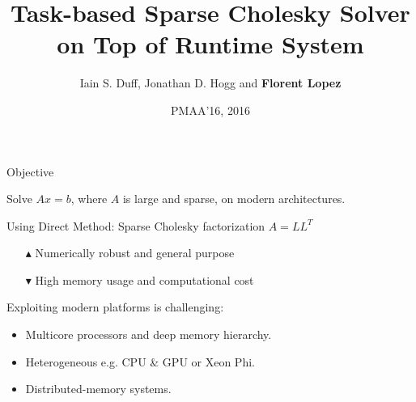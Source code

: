 \documentclass[unknownkeysallowed]{beamer}
\author{Iain S. Duff, Jonathan D. Hogg and {\bf Florent Lopez}}
\institute{Rutherford Appleton Laboratory
  \\ \alert{NLAFET Project}}
\title{Task-based Sparse Cholesky Solver on Top of Runtime System}
\date{PMAA'16, 2016}
\newcommand{\dg}[1]{\textcolor{mgreen}{#1\xspace}}
\newcommand{\dr}[1]{\textcolor{mred}{#1\xspace}}
\newcommand{\db}[1]{\textcolor{mblue}{#1\xspace}}
\begin{document}
\begin{frame}[t,plain]
\titlepage
\end{frame}

\begin{frame}{Objective}

  Solve \alert{$Ax=b$}, where $A$ is \db{large} and \db{sparse}, on
  modern architectures.

  \vspace{0.5cm}
  
  Using \db{Direct Method}: Sparse Cholesky factorization $A=LL^{T}$
  \begin{itemize}
  \item[\dg{$\blacktriangle$}] Numerically robust and general purpose
  \item[\dr{$\blacktriangledown$}] High memory usage and computational cost
  \end{itemize}

  \vspace{0.5cm}

  Exploiting modern platforms is challenging:
  \begin{itemize}
  \item \db{Multicore} processors and deep \db{memory hierarchy}.
  \item \db{Heterogeneous} e.g. CPU \& GPU or Xeon Phi.
  \item \db{Distributed-memory} systems. 
  \end{itemize}

\end{frame}
\end{document}
